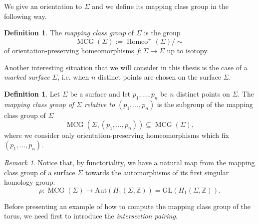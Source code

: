 \documentclass[a4paper,12 pt,titlepage,twoside]{book}
\newcommand{\numberset}{\mathbb}
\newcommand{\Z}{\numberset{Z}}
\DeclareMathOperator{\mcg}{MCG}
\DeclareMathOperator{\home}{Homeo}
\theoremstyle{plain}
\theoremstyle{theorem}
\theoremstyle{definition}
\newtheorem{defn}[thm]{Definition}
\theoremstyle{remark}
\newtheorem{oss}[thm]{Remark}
\begin{document}
We give an orientation to $\Sigma$ and we define its mapping class group in the following way.
\begin{defn}
	The \emph{mapping class group} of $\Sigma$ is the group $$\mcg(\Sigma) := \home^+(\Sigma)/\sim$$ of orientation-preserving homeomorphisms $f \colon \Sigma \rightarrow \Sigma$ up to isotopy.
\end{defn}
Another interesting situation that we will consider in this thesis is the case of a  \emph{marked surface} $\Sigma$, i.e. when $n$ distinct points are chosen on the surface $\Sigma$.
\begin{defn}
	Let $\Sigma$ be a surface and let $p_1, \dots, p_n$ be $n$ distinct points on $\Sigma.$ The \emph{mapping class group of $\Sigma$ relative to $(p_1,\dots,p_n)$} is the subgroup of the mapping class group of $\Sigma$ $$\mcg(\Sigma, (p_1, \dots, p_n)) \subseteq \mcg(\Sigma),$$ where we consider only orientation-preserving homeomorphisms which fix $(p_1,\dots,p_n).$ 
\end{defn}
\begin{oss}\label{rmk: functoriality of mcg}
	Notice that, by functoriality, we have a natural map from the mapping class group of a surface $\Sigma$ towards the automorphisms of its first singular homology group: $$\rho \colon \mcg(\Sigma) \rightarrow \text{Aut}(H_1(\Sigma,\Z)) = \text{GL}(H_1(\Sigma, \Z)).$$
\end{oss}
Before presenting an example of how to compute the mapping class group of the torus, we need first to introduce the \emph{intersection pairing}.
\end{document}
